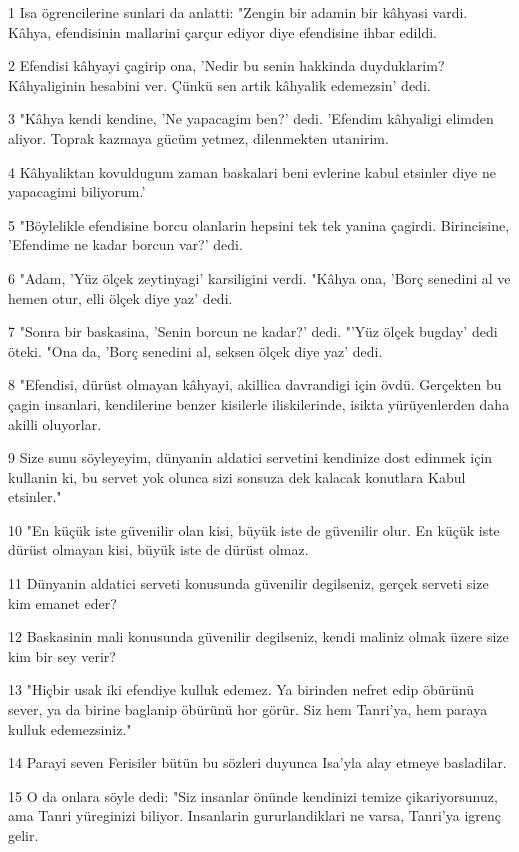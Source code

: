 \par 1 Isa ögrencilerine sunlari da anlatti: "Zengin bir adamin bir kâhyasi vardi. Kâhya, efendisinin mallarini çarçur ediyor diye efendisine ihbar edildi.
\par 2 Efendisi kâhyayi çagirip ona, 'Nedir bu senin hakkinda duyduklarim? Kâhyaliginin hesabini ver. Çünkü sen artik kâhyalik edemezsin' dedi.
\par 3 "Kâhya kendi kendine, 'Ne yapacagim ben?' dedi. 'Efendim kâhyaligi elimden aliyor. Toprak kazmaya gücüm yetmez, dilenmekten utanirim.
\par 4 Kâhyaliktan kovuldugum zaman baskalari beni evlerine kabul etsinler diye ne yapacagimi biliyorum.'
\par 5 "Böylelikle efendisine borcu olanlarin hepsini tek tek yanina çagirdi. Birincisine, 'Efendime ne kadar borcun var?' dedi.
\par 6 "Adam, 'Yüz ölçek zeytinyagi' karsiligini verdi. "Kâhya ona, 'Borç senedini al ve hemen otur, elli ölçek diye yaz' dedi.
\par 7 "Sonra bir baskasina, 'Senin borcun ne kadar?' dedi. "'Yüz ölçek bugday' dedi öteki. "Ona da, 'Borç senedini al, seksen ölçek diye yaz' dedi.
\par 8 "Efendisi, dürüst olmayan kâhyayi, akillica davrandigi için övdü. Gerçekten bu çagin insanlari, kendilerine benzer kisilerle iliskilerinde, isikta yürüyenlerden daha akilli oluyorlar.
\par 9 Size sunu söyleyeyim, dünyanin aldatici servetini kendinize dost edinmek için kullanin ki, bu servet yok olunca sizi sonsuza dek kalacak konutlara Kabul etsinler."
\par 10 "En küçük iste güvenilir olan kisi, büyük iste de güvenilir olur. En küçük iste dürüst olmayan kisi, büyük iste de dürüst olmaz.
\par 11 Dünyanin aldatici serveti konusunda güvenilir degilseniz, gerçek serveti size kim emanet eder?
\par 12 Baskasinin mali konusunda güvenilir degilseniz, kendi maliniz olmak üzere size kim bir sey verir?
\par 13 "Hiçbir usak iki efendiye kulluk edemez. Ya birinden nefret edip öbürünü sever, ya da birine baglanip öbürünü hor görür. Siz hem Tanri'ya, hem paraya kulluk edemezsiniz."
\par 14 Parayi seven Ferisiler bütün bu sözleri duyunca Isa'yla alay etmeye basladilar.
\par 15 O da onlara söyle dedi: "Siz insanlar önünde kendinizi temize çikariyorsunuz, ama Tanri yüreginizi biliyor. Insanlarin gururlandiklari ne varsa, Tanri'ya igrenç gelir.
